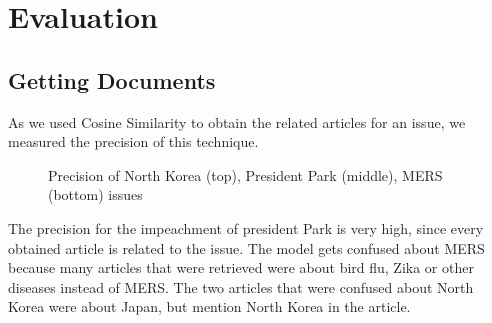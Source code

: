 \section{Evaluation}

\subsection{Getting Documents}
As we used Cosine Similarity to obtain the related articles for an issue, we measured the precision of this technique.

\begin{figure}[h]
\centering
{}
\caption{Precision of North Korea (top), President Park (middle), MERS (bottom) issues}
\end{figure}

The precision for the impeachment of president Park is very high, since every obtained article is related to the issue. The model gets confused about MERS because many articles that were retrieved were about bird flu, Zika or other diseases instead of MERS. The two articles that were confused about North Korea were about Japan, but mention North Korea in the article.

